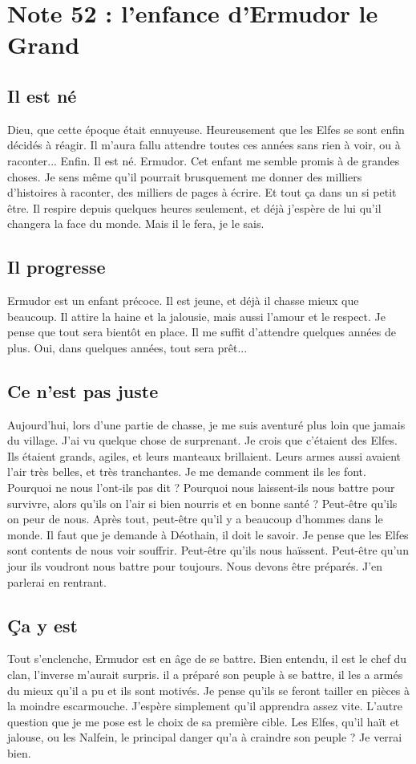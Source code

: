 \section{Note 52 : l'enfance d'Ermudor le Grand}
\subsection{Il est né}
Dieu, que cette époque était ennuyeuse. Heureusement que les Elfes se sont enfin décidés à réagir. Il m'aura fallu attendre toutes ces années sans rien à voir, ou à raconter... Enfin. Il est né. Ermudor. Cet enfant me semble promis à de grandes choses. Je sens même qu'il pourrait brusquement me donner des milliers d'histoires à raconter, des milliers de pages à écrire. Et tout ça dans un si petit être. Il respire depuis quelques heures seulement, et déjà j'espère de lui qu'il changera la face du monde. Mais il le fera, je le sais.

\subsection{Il progresse}
Ermudor est un enfant précoce. Il est jeune, et déjà il chasse mieux que beaucoup. Il attire la haine et la jalousie, mais aussi l'amour et le respect. Je pense que tout sera bientôt en place. Il me suffit d'attendre quelques années de plus. Oui, dans quelques années, tout sera prêt...

\subsection{Ce n'est pas juste}
Aujourd'hui, lors d'une partie de chasse, je me suis aventuré plus loin que jamais du village. J'ai vu quelque chose de surprenant. Je crois que c'étaient des Elfes. Ils étaient grands, agiles, et leurs manteaux brillaient. Leurs armes aussi avaient l'air très belles, et très tranchantes. Je me demande comment ils les font. Pourquoi ne nous l'ont-ils pas dit ? Pourquoi nous laissent-ils nous battre pour survivre, alors qu'ils on l'air si bien nourris et en bonne santé ? Peut-être qu'ils on peur de nous. Après tout, peut-être qu'il y a beaucoup d'hommes dans le monde. Il faut que je demande à Déothain, il doit le savoir. Je pense que les Elfes sont contents de nous voir souffrir. Peut-être qu'ils nous haïssent. Peut-être qu'un jour ils voudront nous battre pour toujours. Nous devons être préparés. J'en parlerai en rentrant.

\subsection{Ça y est}
Tout s'enclenche, Ermudor est en âge de se battre. Bien entendu, il est le chef du clan, l'inverse m'aurait surpris. il a préparé son peuple à se battre, il les a armés du mieux qu'il a pu et ils sont motivés. Je pense qu'ils se feront tailler en pièces à la moindre escarmouche. J'espère simplement qu'il apprendra assez vite. L'autre question que je me pose est le choix de sa première cible. Les Elfes, qu'il haït et jalouse, ou les Nalfein, le principal danger qu'a à craindre son peuple ? Je verrai bien.